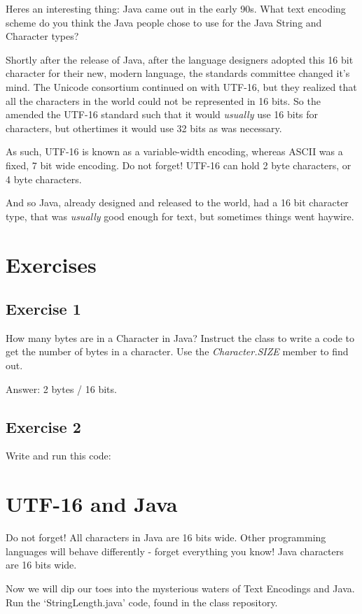 \documentclass[12pt]{article}
\begin{document}
Heres an interesting thing: Java came out in the early 90s. What text encoding
scheme do you think the Java people chose to use for the  Java String and
Character types?

Shortly after the release of Java, after the language designers adopted this 16 bit character for their new, modern language, the standards committee changed it's mind. The Unicode consortium continued on with UTF-16, but they realized that all the characters in the world could not be represented in 16 bits. So the amended the UTF-16 standard such that it would \textit{usually} use 16 bits for characters, but othertimes it would use 32 bits as was necessary.

As such, UTF-16 is known as a variable-width encoding, whereas ASCII was a fixed, 7 bit wide encoding. Do not forget! UTF-16 can hold 2 byte characters, or 4 byte characters.

And so Java, already designed and released to the world, had a 16 bit character type, that was \textit{usually} good enough for text, but sometimes things went haywire.

\section{Exercises}
\subsection{Exercise 1}
How many bytes are in a Character in Java? Instruct the class to write a code to get the number of bytes in a character. Use the \textit{Character.SIZE} member to find out.

Answer: 2 bytes / 16 bits.

\subsection{Exercise 2}
Write and run this code:


\section{UTF-16 and Java}
Do not forget! All characters in Java are 16 bits wide. Other programming languages will behave differently - forget everything you know! Java characters are 16 bits wide.

Now we will dip our toes into the mysterious waters of Text Encodings and Java. Run the `StringLength.java' code, found in the class repository.
\end{document}
